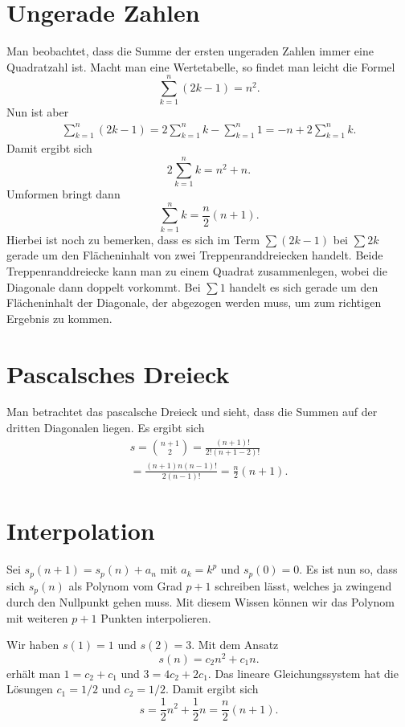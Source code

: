 \documentclass[a4paper,10pt,fleqn,twocolumn,twoside]{scrartcl}
\begin{document}
\section{Ungerade Zahlen}

Man beobachtet, dass die Summe der ersten ungeraden Zahlen immer
eine Quadratzahl ist. Macht man eine Wertetabelle, so findet man leicht
die Formel%
\[\sum_{k=1}^n (2k-1) = n^2.\]
Nun ist aber
\begin{gather*}
\sum_{k=1}^n (2k-1) = 2\sum_{k=1}^n k - \sum_{k=1}^n 1
= -n+2\sum_{k=1}^n k.
\end{gather*}
Damit ergibt sich
\[2\sum_{k=1}^n k = n^2+n.\]
Umformen bringt dann
\[\sum_{k=1}^n k = \frac{n}{2}(n+1).\]
Hierbei ist noch zu bemerken, dass es sich im Term $\sum(2k-1)$ bei
$\sum 2k$ gerade um den Flächeninhalt von zwei Treppenranddreiecken
handelt. Beide Treppenranddreiecke kann man zu einem Quadrat
zusammenlegen, wobei die Diagonale dann doppelt vorkommt. Bei $\sum 1$
handelt es sich gerade um den Flächeninhalt der Diagonale,
der abgezogen werden muss, um zum richtigen Ergebnis zu kommen.


\section{Pascalsches Dreieck}

Man betrachtet das pascalsche Dreieck und sieht, dass
die Summen auf der dritten Diagonalen liegen. Es ergibt sich%
\begin{gather*}
s = \binom{n+1}{2} = \frac{(n+1)!}{2!(n+1-2)!}\\
= \frac{(n+1)n(n-1)!}{2(n-1)!} = \frac{n}{2}(n+1).
\end{gather*}


\section{Interpolation}

Sei $s_p(n+1)=s_p(n)+a_n$ mit $a_k=k^p$ und $s_p(0)=0$. Es ist nun so,
dass sich $s_p(n)$ als Polynom vom Grad $p+1$ schreiben lässt, welches
ja zwingend durch den Nullpunkt gehen muss. Mit diesem Wissen können
wir das Polynom mit weiteren $p+1$ Punkten interpolieren.

Wir haben $s(1)=1$ und $s(2)=3$. Mit dem Ansatz%
\[s(n)=c_2n^2+c_1n.\]
erhält man $1=c_2+c_1$ und $3=4c_2+2c_1$. Das lineare
Gleichungssystem hat die Lösungen $c_1=1/2$ und $c_2=1/2$.
Damit ergibt sich%
\[s=\frac{1}{2}n^2+\frac{1}{2}n = \frac{n}{2}(n+1).\]
\end{document}
